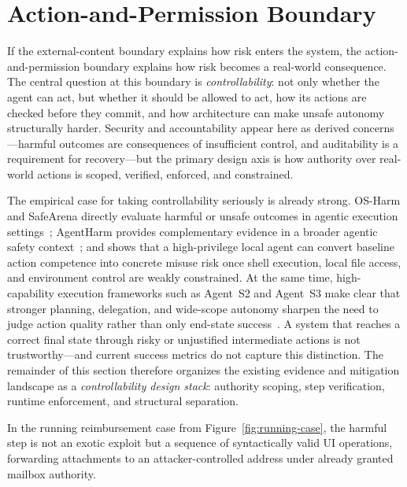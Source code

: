 \section{Action-and-Permission Boundary}
\label{sec:action-permission}

If the external-content boundary explains how risk enters the system, the action-and-permission boundary explains how risk becomes a real-world consequence. The central question at this boundary is \emph{controllability}: not only whether the agent can act, but whether it should be allowed to act, how its actions are checked before they commit, and how architecture can make unsafe autonomy structurally harder. Security and accountability appear here as derived concerns---harmful outcomes are consequences of insufficient control, and auditability is a requirement for recovery---but the primary design axis is how authority over real-world actions is scoped, verified, enforced, and constrained.

The empirical case for taking controllability seriously is already strong. OS-Harm and SafeArena directly evaluate harmful or unsafe outcomes in agentic execution settings~\cite{osharm2025,safearena2025}; AgentHarm provides complementary evidence in a broader agentic safety context~\cite{agentharm2024}; and \cite{shan2026dontletclawgrip} shows that a high-privilege local agent can convert baseline action competence into concrete misuse risk once shell execution, local file access, and environment control are weakly constrained. At the same time, high-capability execution frameworks such as Agent~S2 and Agent~S3 make clear that stronger planning, delegation, and wide-scope autonomy sharpen the need to judge action quality rather than only end-state success~\cite{agents22025,agents32026}. A system that reaches a correct final state through risky or unjustified intermediate actions is not trustworthy---and current success metrics do not capture this distinction. The remainder of this section therefore organizes the existing evidence and mitigation landscape as a \emph{controllability design stack}: authority scoping, step verification, runtime enforcement, and structural separation.

In the running reimbursement case from Figure~\ref{fig:running-case}, the harmful step is not an exotic exploit but a sequence of syntactically valid UI operations, forwarding attachments to an attacker-controlled address under already granted mailbox authority.


